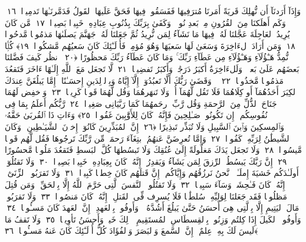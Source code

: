  وَإِذَآ أَرَدنَآ أَن نُّهلِكَ قَريَةً أَمَرنَا مُترَفِيهَا فَفَسَقُوا۟ فِيهَا فَحَقَّ عَلَيهَا ٱلقَولُ فَدَمَّرنَـٰهَا تَدمِيرًۭا ﴿١٦﴾
 وَكَم أَهلَكنَا مِنَ ٱلقُرُونِ مِنۢ بَعدِ نُوحٍۢ ۗ وَكَفَىٰ بِرَبِّكَ بِذُنُوبِ عِبَادِهِۦ خَبِيرًۢا بَصِيرًۭا ﴿١٧﴾
 مَّن كَانَ يُرِيدُ ٱلعَاجِلَةَ عَجَّلنَا لَهُۥ فِيهَا مَا نَشَآءُ لِمَن نُّرِيدُ ثُمَّ جَعَلنَا لَهُۥ جَهَنَّمَ يَصلَىٰهَا مَذمُومًۭا مَّدحُورًۭا ﴿١٨﴾
 وَمَن أَرَادَ ٱلءَاخِرَةَ وَسَعَىٰ لَهَا سَعيَهَا وَهُوَ مُؤمِنٌۭ فَأُو۟لَـٰٓئِكَ كَانَ سَعيُهُم مَّشكُورًۭا ﴿١٩﴾
 كُلًّۭا نُّمِدُّ هَـٰٓؤُلَآءِ وَهَـٰٓؤُلَآءِ مِن عَطَآءِ رَبِّكَ ۚ وَمَا كَانَ عَطَآءُ رَبِّكَ مَحظُورًا ﴿٢٠﴾
 ٱنظُر كَيفَ فَضَّلنَا بَعضَهُم عَلَىٰ بَعضٍۢ ۚ وَلَلءَاخِرَةُ أَكبَرُ دَرَجَٰتٍۢ وَأَكبَرُ تَفضِيلًۭا ﴿٢١﴾
 لَّا تَجعَل مَعَ ٱللَّهِ إِلَـٰهًا ءَاخَرَ فَتَقعُدَ مَذمُومًۭا مَّخذُولًۭا ﴿٢٢﴾
 ۞ وَقَضَىٰ رَبُّكَ أَلَّا تَعبُدُوٓا۟ إِلَّآ إِيَّاهُ وَبِٱلوَٟلِدَينِ إِحسَـٰنًا ۚ إِمَّا يَبلُغَنَّ عِندَكَ ٱلكِبَرَ أَحَدُهُمَآ أَو كِلَاهُمَا فَلَا تَقُل لَّهُمَآ أُفٍّۢ وَلَا تَنهَرهُمَا وَقُل لَّهُمَا قَولًۭا كَرِيمًۭا ﴿٢٣﴾
 وَٱخفِض لَهُمَا جَنَاحَ ٱلذُّلِّ مِنَ ٱلرَّحمَةِ وَقُل رَّبِّ ٱرحَمهُمَا كَمَا رَبَّيَانِى صَغِيرًۭا ﴿٢٤﴾
 رَّبُّكُم أَعلَمُ بِمَا فِى نُفُوسِكُم ۚ إِن تَكُونُوا۟ صَـٰلِحِينَ فَإِنَّهُۥ كَانَ لِلأَوَّٰبِينَ غَفُورًۭا ﴿٢٥﴾
 وَءَاتِ ذَا ٱلقُربَىٰ حَقَّهُۥ وَٱلمِسكِينَ وَٱبنَ ٱلسَّبِيلِ وَلَا تُبَذِّر تَبذِيرًا ﴿٢٦﴾
 إِنَّ ٱلمُبَذِّرِينَ كَانُوٓا۟ إِخوَٟنَ ٱلشَّيَـٰطِينِ ۖ وَكَانَ ٱلشَّيطَٰنُ لِرَبِّهِۦ كَفُورًۭا ﴿٢٧﴾
 وَإِمَّا تُعرِضَنَّ عَنهُمُ ٱبتِغَآءَ رَحمَةٍۢ مِّن رَّبِّكَ تَرجُوهَا فَقُل لَّهُم قَولًۭا مَّيسُورًۭا ﴿٢٨﴾
 وَلَا تَجعَل يَدَكَ مَغلُولَةً إِلَىٰ عُنُقِكَ وَلَا تَبسُطهَا كُلَّ ٱلبَسطِ فَتَقعُدَ مَلُومًۭا مَّحسُورًا ﴿٢٩﴾
 إِنَّ رَبَّكَ يَبسُطُ ٱلرِّزقَ لِمَن يَشَآءُ وَيَقدِرُ ۚ إِنَّهُۥ كَانَ بِعِبَادِهِۦ خَبِيرًۢا بَصِيرًۭا ﴿٣٠﴾
 وَلَا تَقتُلُوٓا۟ أَولَـٰدَكُم خَشيَةَ إِملَـٰقٍۢ ۖ نَّحنُ نَرزُقُهُم وَإِيَّاكُم ۚ إِنَّ قَتلَهُم كَانَ خِطـًۭٔا كَبِيرًۭا ﴿٣١﴾
 وَلَا تَقرَبُوا۟ ٱلزِّنَىٰٓ ۖ إِنَّهُۥ كَانَ فَـٰحِشَةًۭ وَسَآءَ سَبِيلًۭا ﴿٣٢﴾
 وَلَا تَقتُلُوا۟ ٱلنَّفسَ ٱلَّتِى حَرَّمَ ٱللَّهُ إِلَّا بِٱلحَقِّ ۗ وَمَن قُتِلَ مَظلُومًۭا فَقَد جَعَلنَا لِوَلِيِّهِۦ سُلطَٰنًۭا فَلَا يُسرِف فِّى ٱلقَتلِ ۖ إِنَّهُۥ كَانَ مَنصُورًۭا ﴿٣٣﴾
 وَلَا تَقرَبُوا۟ مَالَ ٱليَتِيمِ إِلَّا بِٱلَّتِى هِىَ أَحسَنُ حَتَّىٰ يَبلُغَ أَشُدَّهُۥ ۚ وَأَوفُوا۟ بِٱلعَهدِ ۖ إِنَّ ٱلعَهدَ كَانَ مَسـُٔولًۭا ﴿٣٤﴾
 وَأَوفُوا۟ ٱلكَيلَ إِذَا كِلتُم وَزِنُوا۟ بِٱلقِسطَاسِ ٱلمُستَقِيمِ ۚ ذَٟلِكَ خَيرٌۭ وَأَحسَنُ تَأوِيلًۭا ﴿٣٥﴾
 وَلَا تَقفُ مَا لَيسَ لَكَ بِهِۦ عِلمٌ ۚ إِنَّ ٱلسَّمعَ وَٱلبَصَرَ وَٱلفُؤَادَ كُلُّ أُو۟لَـٰٓئِكَ كَانَ عَنهُ مَسـُٔولًۭا ﴿٣٦﴾
